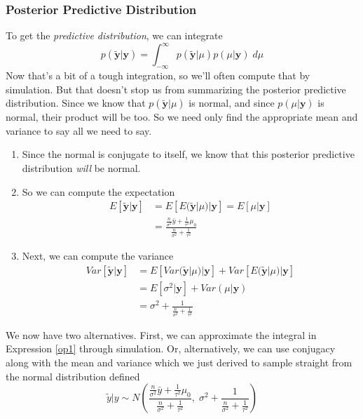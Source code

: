 \documentclass[a4paper,12pt]{scrartcl}
\begin{document}
\newpage
\subsubsection{Posterior Predictive Distribution}
To get the \emph{predictive distribution}, we can integrate
\begin{equation}
   \label{op1}
    p(\tilde{\mathbf{y}} | \mathbf{y}) = \int^\infty_{-\infty}
      p(\tilde{\mathbf{y}} | \mu) p( \mu | \mathbf{y}) \; d\mu 
\end{equation}
Now that's a bit of a tough integration, so we'll often compute
that by simulation. But that doesn't stop us from summarizing the
posterior predictive distribution. Since we know that 
$p(\tilde{\mathbf{y}} | \mu)$ is normal, and since $p(\mu | \mathbf{y})$
is normal, their product will be too. So we need only find the 
appropriate mean and variance to say all we need to say.
\begin{enumerate}
   \item{Since the normal is conjugate to itself, we know that this 
      posterior predictive distribution \emph{will} be normal.}
   \item{So we can compute the expectation
      \begin{align*}
	 E[\tilde{\mathbf{y}} | \mathbf{y} ] &=  
	    E[ E(\tilde{\mathbf{y}} | \mu) |  \mathbf{y} ]  
	    = E[\mu | \mathbf{y}] 
	 \\
	 &= \frac{\frac{n}{\sigma^2} \bar{y}
	 + \frac{1}{\tau^2} \mu_0}{\frac{n}{\sigma^2} + \frac{1}{\tau^2}}
      \end{align*}
	 }
   \item{Next, we can compute the variance
      \begin{align*}
	 Var[\tilde{\mathbf{y}} | \mathbf{y} ] &=  
	    E[ Var(\tilde{\mathbf{y}} | \mu) |  \mathbf{y} ]  
	    + Var[ E(\tilde{\mathbf{y}} | \mu) | \mathbf{y} ]
	 \\
	 &= E[ \sigma^2 | \mathbf{y} ] + Var( \mu | \mathbf{y}) 
	 \\
	 &= \sigma^2 + \frac{1}{\frac{n}{\sigma^2} + \frac{1}{\tau^2}}
      \end{align*}
	 }
\end{enumerate}
We now have two alternatives. First, we can approximate the integral
in Expression \ref{op1} through simulation. Or, alternatively, we
can use conjugacy along with the mean and variance which we just derived
to sample straight from the normal distribution defined
\[ \tilde{y} | y\sim N\left(\frac{\frac{n}{\sigma^2} \bar{y}
      + \frac{1}{\tau^2} \mu_0}{\frac{n}{\sigma^2} + \frac{1}{\tau^2}},
       \; \sigma^2 + \frac{1}{\frac{n}{\sigma^2} + 
      \frac{1}{\tau^2}}\right) \]
\end{document}
